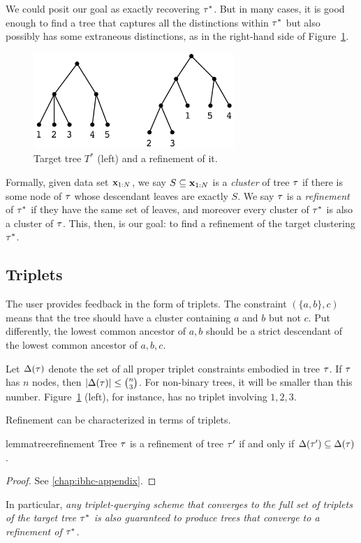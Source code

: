 We could posit our goal as exactly recovering $\tau^*$. But in many cases, it is good enough to find a tree that captures all the distinctions within $\tau^*$ but also possibly has some extraneous distinctions, as in the right-hand side of Figure~\ref{fig:refinement}.

\begin{figure}
    \centering
    \includegraphics[width=3in]{img/ibhc/refinement.pdf}
    \caption{Target tree $T^*$ (left) and a refinement of it.}
    \label{fig:refinement}
\end{figure}

Formally, given data set $\mathbf{x}_{1:N}$, we say $S \subseteq \mathbf{x}_{1:N}$ is a {\it cluster} of tree $\tau$ if there is some node of $\tau$ whose descendant leaves are exactly $S$. We say $\tau$ is a {\it refinement} of $\tau^*$ if they have the same set of leaves, and moreover every cluster of $\tau^*$ is also a cluster of $\tau$. This, then, is our goal: to find a refinement of the target clustering $\tau^*$.

\subsection{Triplets}

The user provides feedback in the form of triplets. The constraint $(\{a,b\},c)$ means that the tree should have a cluster containing $a$ and $b$ but not $c$. Put differently, the lowest common ancestor of $a,b$ should be a strict descendant of the lowest common ancestor of $a,b,c$.

Let $\Delta(\tau)$ denote the set of all proper triplet constraints embodied in tree $\tau$. If $\tau$ has $n$ nodes, then $|\Delta(\tau)| \leq {n \choose 3}$. For non-binary trees, it will be smaller than this number. Figure~\ref{fig:refinement} (left), for instance, has no triplet involving $1,2,3$. 

Refinement can be characterized in terms of triplets.
\begin{restatable}{lemma}{treerefinement}
\label{thm:treerefinement}
Tree $\tau$ is a refinement of tree $\tau'$ if and only if $\Delta(\tau') \subseteq \Delta(\tau)$.
\end{restatable}
\begin{proof}
See \autoref{chap:ibhc-appendix}.
\end{proof}
In particular, {\it any triplet-querying scheme that converges to the full set of triplets of the target tree $\tau^*$ is also guaranteed to produce trees that converge to a refinement of $\tau^*$.}

